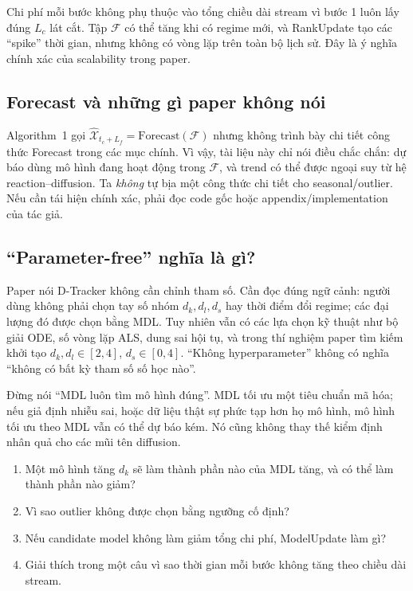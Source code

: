 \begin{keypoint}
Chi phí mỗi bước không phụ thuộc vào tổng chiều dài stream vì bước 1 luôn lấy đúng $L_c$ lát cắt.
Tập $\mathcal{F}$ có thể tăng khi có regime mới, và RankUpdate tạo các ``spike'' thời gian, nhưng
không có vòng lặp trên toàn bộ lịch sử. Đây là ý nghĩa chính xác của scalability trong paper.
\end{keypoint}

\subsection{Forecast và những gì paper không nói}

Algorithm~1 gọi $\widehat{\mathcal{X}}_{t_c+L_f}=\mathrm{Forecast}(\mathcal{F})$ nhưng không trình
bày chi tiết công thức Forecast trong các mục chính. Vì vậy, tài liệu này chỉ nói điều chắc chắn:
dự báo dùng mô hình đang hoạt động trong $\mathcal{F}$, và trend có thể được ngoại suy từ hệ
reaction--diffusion. Ta \emph{không} tự bịa một công thức chi tiết cho seasonal/outlier. Nếu cần
tái hiện chính xác, phải đọc code gốc hoặc appendix/implementation của tác giả.

\subsection{``Parameter-free'' nghĩa là gì?}

Paper nói D-Tracker không cần chỉnh tham số. Cần đọc đúng ngữ cảnh: người dùng không phải chọn
tay số nhóm $d_k,d_l,d_s$ hay thời điểm đổi regime; các đại lượng đó được chọn bằng MDL. Tuy nhiên
vẫn có các lựa chọn kỹ thuật như bộ giải ODE, số vòng lặp ALS, dung sai hội tụ, và trong thí nghiệm
paper tìm kiếm khởi tạo $d_k,d_l\in[2,4]$, $d_s\in[0,4]$. ``Không hyperparameter'' không có nghĩa
``không có bất kỳ tham số số học nào''.

\begin{commonmistake}
Đừng nói ``MDL luôn tìm mô hình đúng''. MDL tối ưu một tiêu chuẩn mã hóa; nếu giả định nhiễu sai,
hoặc dữ liệu thật sự phức tạp hơn họ mô hình, mô hình tối ưu theo MDL vẫn có thể dự báo kém. Nó
cũng không thay thế kiểm định nhân quả cho các mũi tên diffusion.
\end{commonmistake}

\begin{selfcheck}
\begin{enumerate}
  \item Một mô hình tăng $d_k$ sẽ làm thành phần nào của MDL tăng, và có thể làm thành phần nào giảm?
  \item Vì sao outlier không được chọn bằng ngưỡng cố định?
  \item Nếu candidate model không làm giảm tổng chi phí, ModelUpdate làm gì?
  \item Giải thích trong một câu vì sao thời gian mỗi bước không tăng theo chiều dài stream.
\end{enumerate}
\end{selfcheck}
